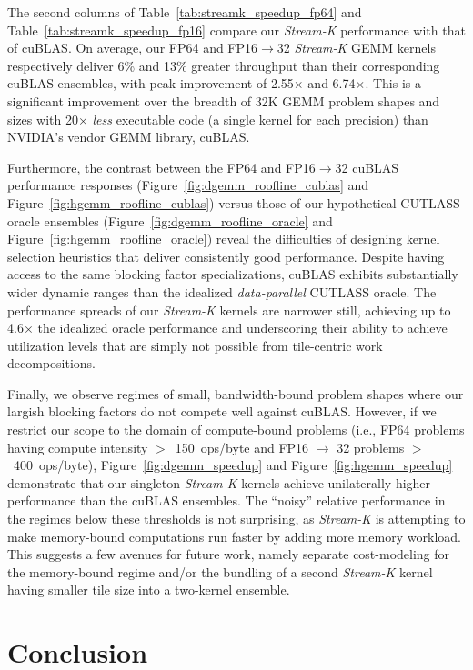 The second columns of Table~\ref{tab:streamk_speedup_fp64} and
Table~\ref{tab:streamk_speedup_fp16} compare our \emph{Stream-K} performance with that of cuBLAS\@. On average, our FP64 and FP16$\rightarrow$32
\emph{Stream-K} GEMM kernels respectively deliver 6\% and 13\% greater throughput than their corresponding cuBLAS ensembles, with peak improvement of 2.55$\times$ and 6.74$\times$. This is a significant improvement over the breadth of 32K GEMM problem shapes and sizes with 20$\times$ \emph{less} executable code (a single kernel for each precision) than NVIDIA's vendor GEMM library, cuBLAS\@.

Furthermore, the contrast between the FP64 and FP16$\rightarrow$32
cuBLAS performance responses (Figure~\ref{fig:dgemm_roofline_cublas} and
Figure~\ref{fig:hgemm_roofline_cublas}) versus those of our hypothetical CUTLASS oracle ensembles (Figure~\ref{fig:dgemm_roofline_oracle} and
Figure~\ref{fig:hgemm_roofline_oracle}) reveal the difficulties of designing kernel selection heuristics that deliver consistently good performance. Despite having access to the same blocking factor specializations, cuBLAS exhibits substantially wider dynamic ranges than the idealized
\emph{data-parallel} CUTLASS oracle. The performance spreads of our
\emph{Stream-K} kernels are narrower still, achieving up to 4.6$\times$
the idealized oracle performance and underscoring their ability to achieve utilization levels that are simply not possible from tile-centric work decompositions.

Finally, we observe regimes of small, bandwidth-bound problem shapes where our largish blocking factors do not compete well against cuBLAS. However, if we restrict our scope to the domain of compute-bound problems (i.e., FP64 problems having compute intensity $>$~150~ops/byte and FP16 $\rightarrow$ 32 problems $>$~400~ops/byte), Figure~\ref{fig:dgemm_speedup}
and Figure~\ref{fig:hgemm_speedup} demonstrate that our singleton
\emph{Stream-K} kernels achieve unilaterally higher performance than the cuBLAS ensembles. The ``noisy'' relative performance in the regimes below these thresholds is not surprising, as \emph{Stream-K} is attempting to make memory-bound computations run faster by adding more memory workload. This suggests a few avenues for future work, namely separate cost-modeling for the memory-bound regime and/or the bundling of a second \emph{Stream-K} kernel having smaller tile size into a two-kernel ensemble.

\section{Conclusion}

